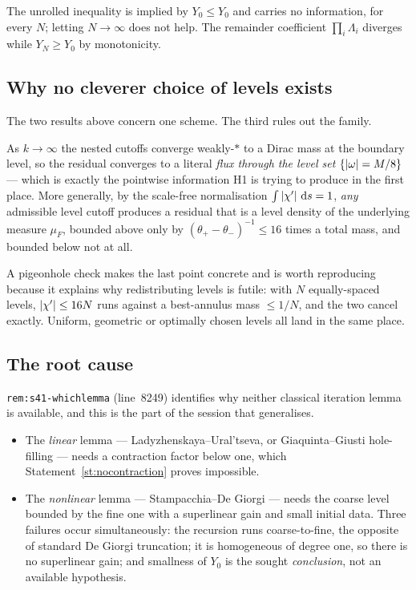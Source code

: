 \begin{statement}
\label{st:vacuous}
\IMPOSSIBLE{} The unrolled inequality is implied by \(Y_0\le Y_0\) and carries
no information, for every \(N\); letting \(N\to\infty\) does not help. The
remainder coefficient \(\prod_i\Lambda_i\) diverges while \(Y_N\ge Y_0\) by
monotonicity.
\end{statement}

\subsection{Why no cleverer choice of levels exists}

The two results above concern one scheme. The third rules out the family.

\begin{statement}
\label{st:coarea}
\IMPOSSIBLE{} As \(k\to\infty\) the nested cutoffs converge weakly-\(*\) to a
Dirac mass at the boundary level, so the residual converges to a literal
\emph{flux through the level set} \(\{\left|\omega\right|=M/8\}\) --- which is exactly
the pointwise information H1 is trying to produce in the first place. More
generally, by the scale-free normalisation \(\int\left|\chi'\right|\,\mathrm{d} s=1\),
\emph{any} admissible level cutoff produces a residual that is a level density
of the underlying measure \(\mu_F\), bounded above only by
\((\theta_+-\theta_-)^{-1}\le16\) times a total mass, and bounded below not at
all.
\end{statement}

A pigeonhole check makes the last point concrete and is worth reproducing
because it explains why redistributing levels is futile: with \(N\)
equally-spaced levels, \(\left|\chi'\right|\le16N\) runs against a best-annulus mass
\(\le1/N\), and the two cancel exactly. Uniform, geometric or optimally chosen
levels all land in the same place.

\subsection{The root cause}

\texttt{rem:s41-whichlemma} (line~8249) identifies why neither classical
iteration lemma is available, and this is the part of the session that
generalises.

\begin{itemize}[leftmargin=1.6em]
\item The \emph{linear} lemma --- Ladyzhenskaya--Ural'tseva, or
  Giaquinta--Giusti hole-filling --- needs a contraction factor below one,
  which Statement~\ref{st:nocontraction} proves impossible.
\item The \emph{nonlinear} lemma --- Stampacchia--De Giorgi --- needs the
  coarse level bounded by the fine one with a superlinear gain and small
  initial data. Three failures occur simultaneously: the recursion runs
  coarse-to-fine, the opposite of standard De Giorgi truncation; it is
  homogeneous of degree one, so there is no superlinear gain; and smallness of
  \(Y_0\) is the sought \emph{conclusion}, not an available hypothesis.
\end{itemize}

